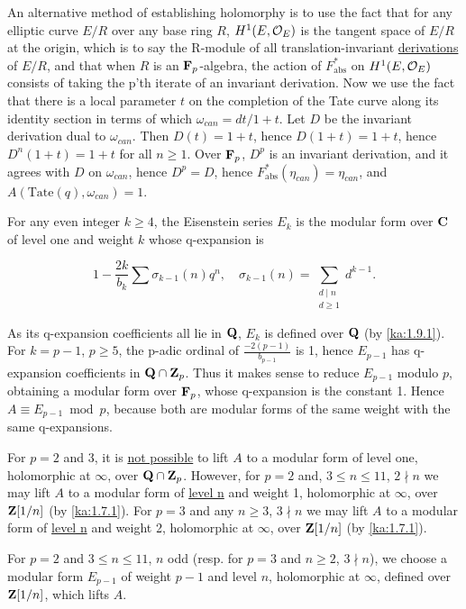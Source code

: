 An alternative method of establishing holomorphy is to use the fact that for any
elliptic curve $E/R$ over any base ring $R$, $H^1(E,\mathcal{O}_E)$ is the tangent
space of $E/R$ at the origin, which is to say the R-module of all
translation-invariant \uline{derivations} of $E/R$, and that when $R$ is an
$\mathbf{F}_p$-algebra, the action of $F_{\mathrm{abs}}^*$ on $H^1(E,\mathcal{O}_E)$ consists
of taking the p'th iterate of an invariant derivation. Now we use the fact that
there is a local parameter $t$ on the completion of the Tate curve along its
identity section in terms of which $\omega_{can} = dt/1+t$. Let $D$ be the
invariant derivation dual to $\omega_{can}$. Then $D(t)=1+t$, hence
$D(1+t)=1+t$, hence $D^n(1+t)=1+t$ for all $n\geq 1$. Over $\mathbf{F}_p$, $D^p$ is an
invariant derivation, and it agrees with $D$ on $\omega_{can}$, hence $D^p=D$,
hence $F_{\mathrm{abs}}^*(\eta_{can})=\eta_{can}$, and
$A(\mathrm{Tate}(q),\omega_{can})=1$.


For any even integer $k\geq 4$, the Eisenstein series $E_k$ is the modular form
over $\mathbf{C}$ of level one and weight $k$ whose q-expansion is

\[
1 - \frac{2k}{b_k}\sum \sigma_{k-1}(n)q^n, \quad
\sigma_{k-1}(n)=\sum_{\substack{d\mid n\\ d\geq 1}} d^{k-1}.
\]

As its q-expansion coefficients all lie in $\mathbf{Q}$, $E_k$ is defined over $\mathbf{Q}$
(by \eqref{ka:1.9.1}). For $k=p-1$, $p\geq 5$, the p-adic ordinal of
$\frac{-2(p-1)}{b_{p-1}}$ is 1, hence $E_{p-1}$ has q-expansion coefficients in
$\mathbf{Q}\cap\mathbf{Z}_p$. Thus it makes sense to reduce $E_{p-1}$ modulo $p$, obtaining a
modular form over $\mathbf{F}_p$, whose q-expansion is the constant 1. Hence
$A\equiv E_{p-1}\bmod p$, because both are modular forms of the same weight with
the same q-expansions.

For $p=2$ and 3, it is \uline{not possible} to lift $A$ to a modular form of
level one, holomorphic at $\infty$, over $\mathbf{Q}\cap\mathbf{Z}_p$. However, for $p=2$ and,
$3\leq n\leq 11$, $2\nmid n$ we may lift $A$ to a modular form of
\uline{level n} and weight 1, holomorphic at $\infty$, over $\mathbf{Z}[1/n]$
(by \eqref{ka:1.7.1}). For $p=3$ and any $n\geq 3$, $3\nmid n$ we may lift $A$ to a
modular form of \uline{level n} and weight 2, holomorphic at $\infty$, over
$\mathbf{Z}[1/n]$ (by \eqref{ka:1.7.1}).

For $p=2$ and $3\leq n\leq 11$, $n$ odd (resp. for $p=3$ and $n\geq 2$,
$3\nmid n$), we choose a modular form $E_{p-1}$ of weight $p-1$ and level $n$,
holomorphic at $\infty$, defined over $\mathbf{Z}[1/n]$, which lifts $A$.

